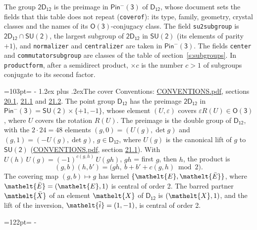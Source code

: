 \documentclass[10pt,a4paper]{article}
\makeatletter
\renewcommand\section{\@startsection{section}{1}{\z@}{-3ex plus -1ex minus -.2ex}%
  {1.2ex plus .2ex}{\normalfont\large\sffamily\bfseries\color{parttitle}}}
\newcommand{\needspace}[1]{\par\penalty-100\begingroup\dimen0=#1\relax\dimen2=\pagegoal
  \advance\dimen2-\pagetotal\ifdim\dimen0>\dimen2\relax\ifdim\dimen2>0pt\vfil\break\fi\fi
  \endgroup}
\numberwithin{equation}{section}
\newcommand{\eltfont}[1]{{\let\sigma\eltsigma\mathelt{#1}}}
\newcommand{\grp}[1]{\mathsf{#1}}
\newcommand{\elt}[1]{\eltfont{#1}}
\newcommand{\dirprod}{\times}
\newcommand{\barred}[1]{\bar{#1}}
\newcommand{\lift}[1]{\tilde{#1}}
\makeatother
\begin{document}
\leavevmode\label{n:element.inversion}\label{n:group.preimage}The group $\grp{2D_{12}}$ is the preimage in $\grp{Pin^{-}(3)}$ of \href{../../../rotation/data/pdf/D12.pdf}{$\grp{D_{12}}$}, whose document sets the fields that this table does not repeat (\texttt{coverof}): its type, family, geometry, crystal classes and the names of its \href{../../../rotation/data/pdf/O3.pdf}{$\grp{O(3)}$}-conjugacy class. The field \texttt{su2subgroup} is $\grp{2D_{12}} \cap \grp{SU(2)}$, the largest subgroup of $\grp{2D_{12}}$ in $\grp{SU(2)}$ (its elements of parity $+1$), and \texttt{normalizer} and \texttt{centralizer} are taken in $\grp{Pin^{-}(3)}$. The fields \texttt{center} and \texttt{commutatorsubgroup} are classes of the table of section~\ref{s:subgroups}.
\leavevmode\label{n:index.conjugates.c}In \texttt{productform}, after a semidirect product, ${\times}c$ is the number $c > 1$ of subgroups conjugate to its second factor.
\needspace{103pt}
\section{The cover}\label{s:cover}
Conventions: \href{../../CONVENTIONS.pdf}{CONVENTIONS.pdf}, sections \href{../../CONVENTIONS.pdf\#conv.20.1}{20.1}, \href{../../CONVENTIONS.pdf\#conv.21.1}{21.1} and \href{../../CONVENTIONS.pdf\#conv.21.2}{21.2}.
\leavevmode\label{n:group.pin.minus}\label{n:group.su2}\label{n:local.pin.sign}\label{n:matrix.covered}\label{n:matrix.lift.su2}\label{n:index.bar}The point group $\grp{D_{12}}$ has the preimage $\grp{2D_{12}}$ in $\grp{Pin^{-}(3)} = \grp{SU(2)} \dirprod \{+1, -1\}$, whose element $(U, \varepsilon)$ covers $\varepsilon R(U) \in \grp{O(3)}$, where $U$ covers the rotation $R(U)$. The preimage is the double group of $\grp{D_{12}}$, with the $2 \cdot 24 = 48$ elements $(g, 0) = (U(g), \det g)$ and $(g, 1) = (-U(g), \det g)$, $g \in \grp{D_{12}}$, where $U(g)$ is the canonical lift of $g$ to $\grp{SU(2)}$ (\href{../../CONVENTIONS.pdf}{CONVENTIONS.pdf}, section \href{../../CONVENTIONS.pdf\#conv.21.1}{21.1}). \label{n:function.cocycle}With $U(h)\,U(g) = (-1)^{c(g,h)}\,U(gh)$, $gh$ = first $g$, then $h$, the product is
\begin{equation}\label{e:product}(g, b)(h, b') = \bigl(gh,\ b + b' + c(g, h) \bmod 2\bigr).\end{equation}
\leavevmode\label{n:mark.bar}The covering map $(g, b) \mapsto g$ has kernel $\{\elt{E}, \elt{\barred{E}}\}$, where $\elt{\barred{E}} = (\elt{E}, 1)$ is central of order 2. \label{n:element.named}\label{n:mark.lift}The barred partner $\elt{\barred{X}}$ of an element $\elt{X}$ of $\grp{D_{12}}$ is $(\elt{X}, 1)$, and the lift of the inversion, $\elt{\lift{i}} = (1, -1)$, is central of order 2.
\needspace{122pt}
\end{document}
